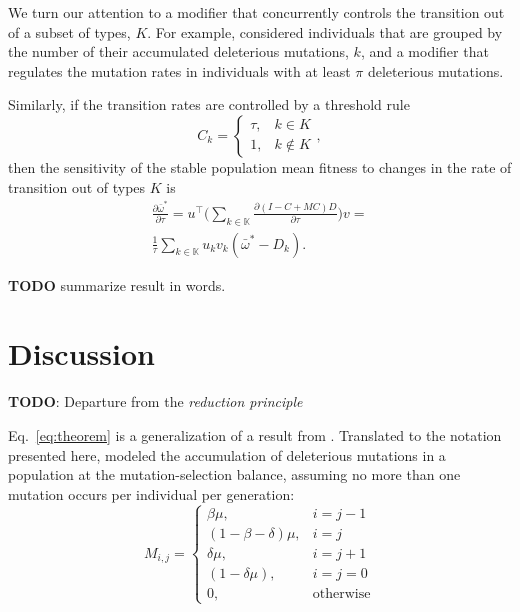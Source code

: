 \documentclass[9pt, a4paper, twocolumn]{extarticle}   	%
\newcommand*{\tr}{^\intercal}
\begin{document}
We turn our attention to a modifier that concurrently controls the transition out of a subset of types, $K$.
For example, \citet[Appendix~B]{Ram2012} considered individuals that are grouped by the number of their accumulated deleterious mutations, $k$, and a modifier that regulates the mutation rates in individuals with at least $\pi$ deleterious mutations.

Similarly, if the transition rates are controlled by a threshold rule 
\begin{equation}
C_k = \begin{cases}
\tau, & k \in K \\
1, & k \not\in K
\end{cases},
\end{equation}
then the sensitivity of the stable population mean fitness to changes in the
rate of transition out of types $K$ is
\begin{equation}
\begin{aligned}
\frac{\partial \bar{\omega}^*}{\partial \tau} = 
u\tr \Big( \sum_{k \in \mathbb{K{}}}{\frac{\partial (I - C + MC)D}{\partial \tau}} \Big) v = \\
\frac{1}{\tau} \sum_{k \in \mathbb{K}}{u_k v_k (\bar{\omega}^* - D_k)}.
\end{aligned}
\end{equation}

\textbf{TODO} summarize result in words.

\section*{Discussion}
\textbf{TODO}: Departure from the \emph{reduction principle}

Eq.~\ref{eq:theorem} is a generalization of a result from \citet[Eq.~4]{Ram2012}.
Translated to the notation presented here, \citeauthor{Ram2012} modeled the accumulation of deleterious mutations in a population at the mutation-selection balance, assuming no more than one mutation occurs per individual per generation: 
\begin{equation}
M_{i,j} = \begin{cases}
\beta \mu, & i = j-1 \\
(1-\beta-\delta) \mu, & i = j \\
\delta \mu, & i = j+1 \\
(1-\delta \mu), & i=j=0 \\
0, & \text{otherwise}
\end{cases}
\end{equation}
\end{document}
